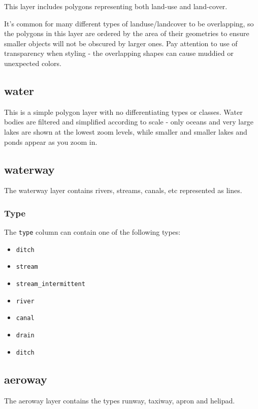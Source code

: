 This layer includes polygons representing both land-use and land-cover.

It's common for many different types of landuse/landcover to be
overlapping, so the polygons in this layer are ordered by the area of
their geometries to ensure smaller objects will not be obscured by
larger ones. Pay attention to use of transparency when styling - the
overlapping shapes can cause muddied or unexpected colors.

\subsection*{water}\label{water}

This is a simple polygon layer with no differentiating types or classes.
Water bodies are filtered and simplified according to scale - only
oceans and very large lakes are shown at the lowest zoom levels, while
smaller and smaller lakes and ponds appear as you zoom in.

\subsection*{waterway}\label{waterway}

The waterway layer contains rivers, streams, canals, etc represented as
lines.

\subsubsection*{Type}

The \texttt{type} column can contain one of the following types:

\begin{itemize}
\item
  \texttt{ditch}
\item
  \texttt{stream}
\item
  \texttt{stream\_intermittent}
\item
  \texttt{river}
\item
  \texttt{canal}
\item
  \texttt{drain}
\item
  \texttt{ditch}
\end{itemize}

\subsection*{aeroway}\label{aeroway}

The aeroway layer contains the types runway, taxiway, apron and helipad.

